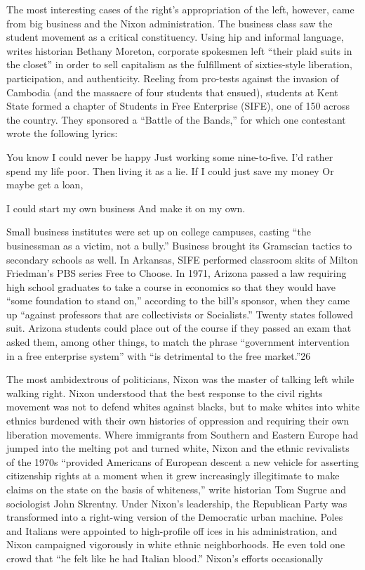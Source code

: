  \par 
The most interesting cases of the right’s appropriation of the left, however, came from big business and the Nixon administration. The business class saw the student movement as a critical constituency. Using hip and informal language, writes historian Bethany Moreton, corporate spokesmen left “their plaid suits in the closet” in order to sell capitalism as the fulfillment of sixties-style liberation, participation, and authenticity. Reeling from pro-tests against the invasion of Cambodia (and the massacre of four students that ensued), students at Kent State formed a chapter of Students in Free Enterprise (SIFE), one of {\color{blue}150} across the country. They sponsored a “Battle of the Bands,” for which one contestant wrote the following lyrics:
 \par 
You know I could never be happy Just working some nine-to-five. I’d rather spend my life poor. Then living it as a lie. If I could just save my money Or maybe get a loan,
 \par 
I could start my own business And make it on my own.
 \par 
Small business institutes were set up on college campuses, casting “the businessman as a victim, not a bully.” Business brought its Gramscian tactics to secondary schools as well. In Arkansas, SIFE performed classroom skits of Milton Friedman’s PBS series Free to Choose. In 1971, Arizona passed a law requiring high school graduates to take a course in economics so that they would have “some foundation to stand on,” according to the bill’s sponsor, when they came up “against professors that are collectivists or Socialists.” Twenty states followed suit. Arizona students could place out of the course if they passed an exam that asked them, among other things, to match the phrase “government intervention in a free enterprise system” with “is detrimental to the free market.”{\color{blue}26}
 \par 
The most ambidextrous of politicians, Nixon was the master of talking left while walking right. Nixon understood that the best response to the civil rights movement was not to defend whites against blacks, but to make whites into white ethnics burdened with their own histories of oppression and requiring their own liberation movements. Where immigrants from Southern and Eastern Europe had jumped into the melting pot and turned white, Nixon and the ethnic revivalists of the 1970s “provided Americans of European descent a new vehicle for asserting citizenship rights at a moment when it grew increasingly illegitimate to make claims on the state on the basis of whiteness,” write historian Tom Sugrue and sociologist John Skrentny. Under Nixon’s leadership, the Republican Party was transformed into a right-wing version of the Democratic urban machine. Poles and Italians were appointed to high-profile off ices in his administration, and Nixon campaigned vigorously in white ethnic neighborhoods. He even told one crowd that “he felt like he had Italian blood.” Nixon’s efforts occasionally
